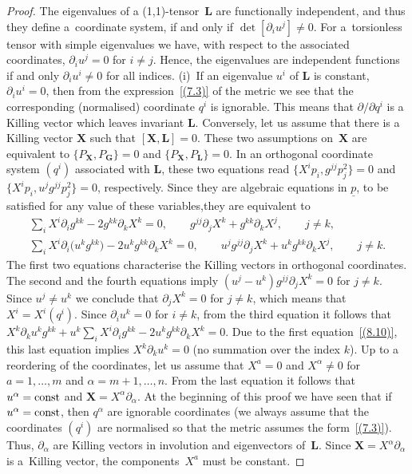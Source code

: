 \documentclass[pdftex]{sigma}
\def\bs{\boldsymbol}
\numberwithin{equation}{section}
\begin{document}
\begin{proof}
The eigenvalues of a (1,1)-tensor~$\bs L$ are functionally independent, and thus they def\/ine a~coordinate system, if and only if $\det[\partial_iu^j]\neq 0$. For a~torsionless tensor with simple eigenvalues we have, with respect to  the associated coordinates, $\partial_iu^j=0$ for $i\neq j$. Hence, the eigenvalues are independent functions if and only $\partial_iu^i\neq 0$ for all indices. (i)~If an eigenvalue $u^i$ of $\bs L$ is constant, $\partial_iu^i=0$, then from the expression~\eqref{(7.3)} of the metric we see that the corresponding (normalised) coordinate $q^i$ is ignorable. This means that $\partial/\partial q^i$ is a Killing vector which leaves invariant $\bs L$. Conversely, let us assume that there is a Killing vector $\bs X$ such that $[\bs X,\bs L]=0$. These two assumptions on~$\bs X$ are equivalent to $\{P_{\bs X}, P_{\bs G}\}=0$ and $\{P_{\bs X}, P_{\bs L}\}=0$. In an orthogonal coordinate system $(q^i)$ associated with $\bs L$, these two equations read $\{X^ip_i, g^{jj}p_j^2\}=0$ and $\{X^ip_i, u^jg^{jj}p_j^2\}=0$, respectively. Since they are algebraic equations in $\underline p$, to be satisf\/ied for any value of these variables,they are equivalent to
\begin{gather*}
\sum_i X^i\partial_ig^{kk}-2 g^{kk} \partial_kX^k=0,
\qquad
 g^{jj} \partial_jX^k+g^{kk} \partial_kX^j, \qquad j\neq k,
\\
 \sum_i X^i\partial_i\big(u^k g^{kk}\big)-2 u^k g^{kk} \partial_kX^k=0,
\qquad u^j g^{jj} \partial_jX^k+u^k g^{kk} \partial_kX^j, \qquad j\neq k.
\end{gather*}
The f\/irst two equations characterise the Killing vectors in orthogonal coordinates. The second and the fourth equations imply $(u^j-u^k) g^{jj} \partial_jX^k=0$ for $j\neq k$. Since $u^j\neq u^k$ we conclude that $\partial_jX^k=0$ for $j\neq k$, which means that $X^i=X^i(q^i)$. Since $\partial_iu^k=0$ for $i\neq k$, from the third equation it follows that $X^k \partial_ku^k g^{kk}+u^k \sum_iX^i \partial_ig^{kk}-2 u^k g^{kk} \partial_kX^k=0$. Due to the f\/irst equation~\eqref{(8.10)}, this last equation implies $X^k \partial_ku^k=0$ (no summation over the index $k$).
Up to a reordering of the coordinates, let us assume that $X^a=0$ and $X^\alpha\neq 0$ for $a=1,\ldots, m$ and $\alpha=m+1,\ldots, n$. From the last equation it follows that $u^\alpha={\rm const}$ and $\bs X=X^\alpha \partial_\alpha$. At the beginning of this proof we have seen that if $u^\alpha={\rm const}$, then $q^\alpha$ are ignorable coordinates (we always assume that the coordinates $(q^i)$ are normalised so that the metric assumes  the form~\eqref{(7.3)}). Thus, $\partial_\alpha$ are Killing vectors in involution and eigenvectors of~$\bs L$. Since $\bs X=X^\alpha \partial_\alpha$ is a~Killing vector, the components~$X^a$ must be constant.
\end{proof}
\end{document}
